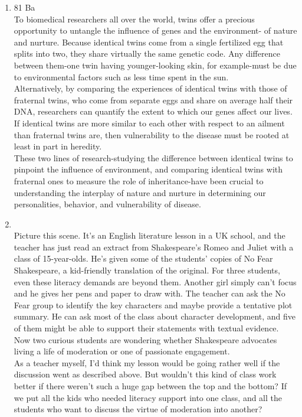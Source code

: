 \documentclass[12pt]{article}
\begin{document}
\begin{enumerate}
    \item 81 Ba\\
      To biomedical researchers all over the world, twins offer a precious opportunity to untangle the influence of genes and the environment- of nature and nurture. Because identical twins come from a single fertilized egg that splits into two, they share virtually the same genetic code. Any difference between them-one twin having younger-looking skin, for example-must be due to environmental factors such as less time spent in the sun.\\

      Alternatively, by comparing the experiences of identical twins with those of fraternal twins, who come from separate eggs and share on average half their DNA, researchers can quantify the extent to which our genes affect our lives. If identical twins are more similar to each other with respect to an ailment than fraternal twins are, then vulnerability to the disease must be rooted at least in part in heredity.\\

      These two lines of research-studying the difference between identical twins to pinpoint the influence of environment, and comparing identical twins with fraternal ones to measure the role of inheritance-have been crucial to understanding the interplay of nature and nurture in determining our personalities, behavior, and vulnerability of disease.

    \item {}\\
      Picture this scene. It's an English literature lesson in a UK school, and the teacher has just read an extract from Shakespeare's Romeo and Juliet with a class of 15-year-olds. He's given some of the students' copies of No Fear Shakespeare, a kid-friendly translation of the original. For three students, even these literacy demands are beyond them. Another girl simply can't focus and he gives her pens and paper to draw with. The teacher can ask the No Fear group to identify the key characters and maybe provide a tentative plot summary. He can ask most of the class about character development, and five of them might be able to support their statements with textual evidence. Now two curious students are wondering whether Shakespeare advocates living a life of moderation or one of passionate engagement.\\

      As a teacher myself, I'd think my lesson would be going rather well if the discussion went as described above. But wouldn't this kind of class work better if there weren't such a huge gap between the top and the bottom? If we put all the kids who needed literacy support into one class, and all the students who want to discuss the virtue of moderation into another?\\


\end{enumerate}
\end{document}
